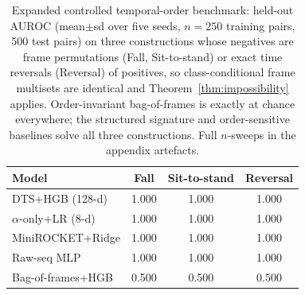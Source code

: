 \begin{table}[t]
\centering
\small
\setlength{\tabcolsep}{4pt}
\begin{tabular}{lccc}
\toprule
Model & Fall & Sit-to-stand & Reversal \\
\midrule
DTS+HGB (128-d) & 1.000 & 1.000 & 1.000 \\
$\alpha$-only+LR (8-d) & 1.000 & 1.000 & 1.000 \\
MiniROCKET+Ridge & 1.000 & 1.000 & 1.000 \\
Raw-seq MLP & 1.000 & 1.000 & 1.000 \\
Bag-of-frames+HGB & 0.500 & 0.500 & 0.500 \\
\bottomrule
\end{tabular}
\caption{Expanded controlled temporal-order benchmark: held-out AUROC (mean$\pm$sd over five seeds, $n{=}250$ training pairs, 500 test pairs) on three constructions whose negatives are frame permutations (Fall, Sit-to-stand) or exact time reversals (Reversal) of positives, so class-conditional frame multisets are identical and Theorem~\ref{thm:impossibility} applies. Order-invariant bag-of-frames is exactly at chance everywhere; the structured signature and order-sensitive baselines solve all three constructions. Full $n$-sweeps in the appendix artefacts.}
\label{tab:bench}
\end{table}
